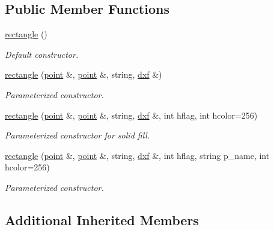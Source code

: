 \subsection*{Public Member Functions}
\begin{DoxyCompactItemize}
\item 
\hypertarget{classrectangle_acdc53c26d992570f77862a76aa6c07e7}{\hyperlink{classrectangle_acdc53c26d992570f77862a76aa6c07e7}{rectangle} ()}\label{classrectangle_acdc53c26d992570f77862a76aa6c07e7}

\begin{DoxyCompactList}\small\item\em Default constructor. \end{DoxyCompactList}\item 
\hyperlink{classrectangle_a2b6c06e9b26e4b69a3219f7d68040cf0}{rectangle} (\hyperlink{classpoint}{point} \&, \hyperlink{classpoint}{point} \&, string, \hyperlink{classdxf}{dxf} \&)
\begin{DoxyCompactList}\small\item\em Parameterized constructor. \end{DoxyCompactList}\item 
\hyperlink{classrectangle_ad057163264d95fa833a1ad9887a78d0c}{rectangle} (\hyperlink{classpoint}{point} \&, \hyperlink{classpoint}{point} \&, string, \hyperlink{classdxf}{dxf} \&, int hflag, int hcolor=256)
\begin{DoxyCompactList}\small\item\em Parameterized constructor for solid fill. \end{DoxyCompactList}\item 
\hypertarget{classrectangle_af6b2a94031985fe184fc0b7bb5466822}{\hyperlink{classrectangle_af6b2a94031985fe184fc0b7bb5466822}{rectangle} (\hyperlink{classpoint}{point} \&, \hyperlink{classpoint}{point} \&, string, \hyperlink{classdxf}{dxf} \&, int hflag, string p\-\_\-name, int hcolor=256)}\label{classrectangle_af6b2a94031985fe184fc0b7bb5466822}

\begin{DoxyCompactList}\small\item\em Parameterized constructor. \end{DoxyCompactList}\end{DoxyCompactItemize}
\subsection*{Additional Inherited Members}


